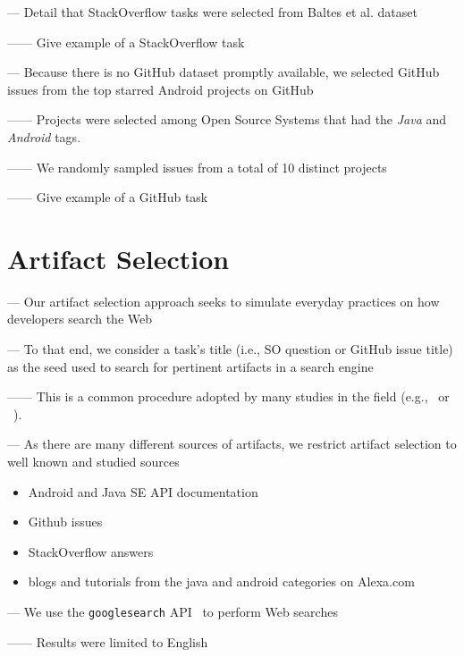 --- Detail that StackOverflow tasks were selected from Baltes et al. dataset~\cite{baltes2019-rep}

------ Give example of a StackOverflow task 


\clearpage

--- Because there is no GitHub dataset promptly available, we selected GitHub issues from the top starred Android projects on GitHub 

------ Projects were selected among Open Source Systems that had the \textit{Java} and \textit{Android} tags. 

------ We randomly sampled issues from a total of 10 distinct projects

------ Give example of a GitHub task 

\section{Artifact Selection}


--- Our artifact selection approach seeks to simulate everyday practices on how developers search the Web~\cite{rao2020, Xia2017} \vspace{3mm}

--- To that end, we consider a task's title (i.e., SO question or GitHub issue title) as the seed used to search for pertinent artifacts in a search engine

------ This is a common procedure adopted by many studies in the field (e.g.,~\cite{Xu2017} or ~\cite{Silva2019}). \vspace{3mm}


--- As there are many different sources of artifacts, we restrict artifact selection to well known and studied sources~\cite{Starke2009,Kevic2014, Li2013}


\begin{itemize}
    \item Android and Java SE API documentation
    \item Github issues
    \item StackOverflow answers 
    \item blogs and tutorials from the java and android categories on Alexa.com~\cite{alexa}
\end{itemize}


\vspace{3mm}

--- We use the \texttt{googlesearch} API~\cite{googlesearch} to perform Web searches

------ Results were limited to English

